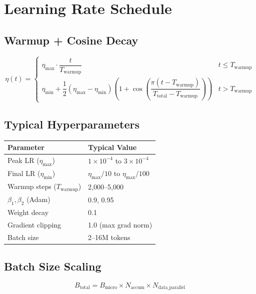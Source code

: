 \documentclass[11pt,a4paper]{article}
\begin{document}
\section{Learning Rate Schedule}

\subsection{Warmup + Cosine Decay}

$$\eta(t) = \begin{cases} \eta_{\max} \cdot \dfrac{t}{T_{\text{warmup}}} & t \leq T_{\text{warmup}} \\[10pt] \eta_{\min} + \dfrac{1}{2}(\eta_{\max} - \eta_{\min})\left(1 + \cos\!\left(\dfrac{\pi(t - T_{\text{warmup}})}{T_{\text{total}} - T_{\text{warmup}}}\right)\right) & t > T_{\text{warmup}} \end{cases}$$

\subsection{Typical Hyperparameters}

\begin{center}
\begin{tabular}{ll}
\toprule
\textbf{Parameter} & \textbf{Typical Value} \\
\midrule
Peak LR ($\eta_{\max}$) & $1 \times 10^{-4}$ to $3 \times 10^{-4}$ \\
Final LR ($\eta_{\min}$) & $\eta_{\max}/10$ to $\eta_{\max}/100$ \\
Warmup steps ($T_{\text{warmup}}$) & 2,000--5,000 \\
$\beta_1, \beta_2$ (Adam) & 0.9, 0.95 \\
Weight decay & 0.1 \\
Gradient clipping & 1.0 (max grad norm) \\
Batch size & 2--16M tokens \\
\bottomrule
\end{tabular}
\end{center}

\subsection{Batch Size Scaling}

$$B_{\text{total}} = B_{\text{micro}} \times N_{\text{accum}} \times N_{\text{data\_parallel}}$$
\end{document}
